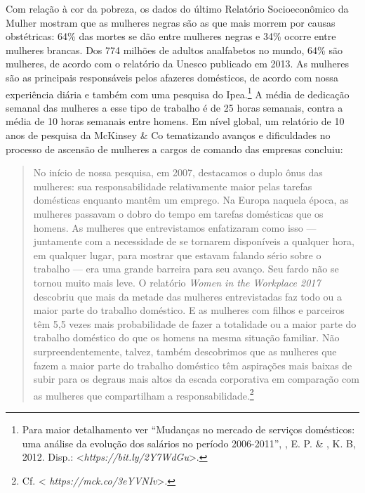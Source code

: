 Com relação à cor da pobreza, os dados do último Relatório
Socioeconômico da Mulher mostram que as mulheres negras são as que mais
morrem por causas obstétricas: 64\% das mortes se dão entre mulheres
negras e 34\% ocorre entre mulheres brancas. Dos 774 milhões de adultos
analfabetos no mundo, 64\% são mulheres, de acordo com o relatório da
Unesco publicado em 2013. As mulheres são as principais responsáveis
pelos afazeres domésticos, de acordo com nossa experiência diária e
também com uma pesquisa do Ipea.\footnote{Para maior detalhamento ver
  ``Mudanças no mercado de serviços domésticos: uma análise da evolução
  dos salários no período 2006-2011'', , E. P. \& , K. B,
  2012. Disp.: \textless{}\emph{https://bit.ly/2Y7WdGu}\textgreater{}.} A
média de dedicação semanal das mulheres a esse tipo de trabalho é de 25
horas semanais, contra a média de 10 horas semanais entre homens. Em
nível global, um relatório de 10 anos de pesquisa da McKinsey \& Co
tematizando avanços e dificuldades no processo de ascensão de mulheres a
cargos de comando das empresas concluiu:

\begin{quote}
No início de nossa pesquisa, em 2007, destacamos o duplo ônus das
mulheres: sua responsabilidade relativamente maior pelas tarefas
domésticas enquanto mantêm um emprego. Na Europa naquela época, as
mulheres passavam o dobro do tempo em tarefas domésticas que os homens.
As mulheres que entrevistamos enfatizaram como isso --- juntamente com a
necessidade de se tornarem disponíveis a qualquer hora, em qualquer
lugar, para mostrar que estavam falando sério sobre o trabalho --- era uma
grande barreira para seu avanço. Seu fardo não se tornou muito mais
leve. O relatório \emph{Women in the Workplace 2017} descobriu que mais
da metade das mulheres entrevistadas faz todo ou a maior parte do
trabalho doméstico. E as mulheres com filhos e parceiros têm 5,5 vezes
mais probabilidade de fazer a totalidade ou a maior parte do trabalho
doméstico do que os homens na mesma situação familiar. Não
surpreendentemente, talvez, também descobrimos que as mulheres que fazem
a maior parte do trabalho doméstico têm aspirações mais baixas de subir
para os degraus mais altos da escada corporativa em comparação com as
mulheres que compartilham a responsabilidade.\footnote{Cf. \textless{}
  \emph{https://mck.co/3eYVNIv}\textgreater{}.}
\end{quote}

